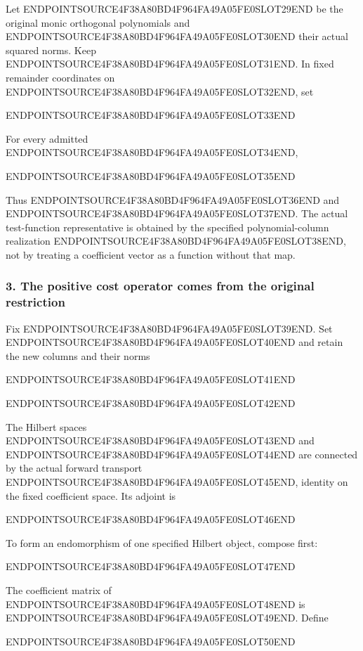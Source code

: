 Let ENDPOINTSOURCE4F38A80BD4F964FA49A05FE0SLOT29END be the original monic orthogonal polynomials and ENDPOINTSOURCE4F38A80BD4F964FA49A05FE0SLOT30END their actual squared norms. Keep ENDPOINTSOURCE4F38A80BD4F964FA49A05FE0SLOT31END. In fixed remainder coordinates on ENDPOINTSOURCE4F38A80BD4F964FA49A05FE0SLOT32END, set

ENDPOINTSOURCE4F38A80BD4F964FA49A05FE0SLOT33END

For every admitted ENDPOINTSOURCE4F38A80BD4F964FA49A05FE0SLOT34END,

ENDPOINTSOURCE4F38A80BD4F964FA49A05FE0SLOT35END

Thus ENDPOINTSOURCE4F38A80BD4F964FA49A05FE0SLOT36END and ENDPOINTSOURCE4F38A80BD4F964FA49A05FE0SLOT37END. The actual test-function representative is obtained by the specified polynomial-column realization ENDPOINTSOURCE4F38A80BD4F964FA49A05FE0SLOT38END, not by treating a coefficient vector as a function without that map.

\subsubsection{3. The positive cost operator comes from the original restriction}\label{endpoint-relation_moment_original--the-positive-cost-operator-comes-from-the-original-restriction}

Fix ENDPOINTSOURCE4F38A80BD4F964FA49A05FE0SLOT39END. Set ENDPOINTSOURCE4F38A80BD4F964FA49A05FE0SLOT40END and retain the new columns and their norms

ENDPOINTSOURCE4F38A80BD4F964FA49A05FE0SLOT41END

ENDPOINTSOURCE4F38A80BD4F964FA49A05FE0SLOT42END

The Hilbert spaces ENDPOINTSOURCE4F38A80BD4F964FA49A05FE0SLOT43END and ENDPOINTSOURCE4F38A80BD4F964FA49A05FE0SLOT44END are connected by the actual forward transport ENDPOINTSOURCE4F38A80BD4F964FA49A05FE0SLOT45END, identity on the fixed coefficient space. Its adjoint is

ENDPOINTSOURCE4F38A80BD4F964FA49A05FE0SLOT46END

To form an endomorphism of one specified Hilbert object, compose first:

ENDPOINTSOURCE4F38A80BD4F964FA49A05FE0SLOT47END

The coefficient matrix of ENDPOINTSOURCE4F38A80BD4F964FA49A05FE0SLOT48END is ENDPOINTSOURCE4F38A80BD4F964FA49A05FE0SLOT49END. Define

ENDPOINTSOURCE4F38A80BD4F964FA49A05FE0SLOT50END

